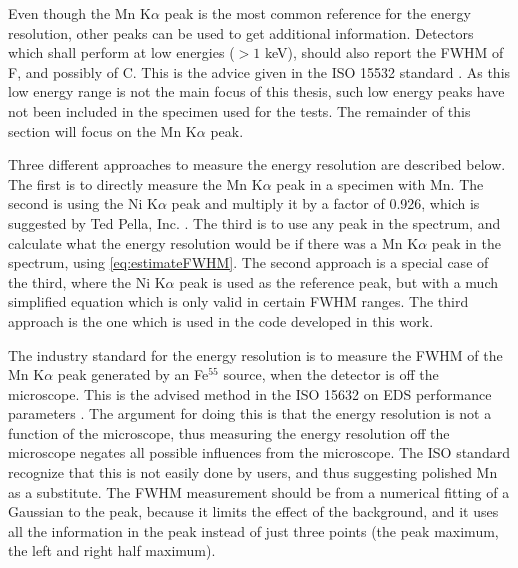 Even though the Mn K$\alpha$ peak is the most common reference for the energy resolution, other peaks can be used to get additional information.
Detectors which shall perform at low energies ($>1$ keV), should also report the FWHM of F, and possibly of C.
This is the advice given in the ISO 15532 standard \cite{iso_qc_15632}.
As this low energy range is not the main focus of this thesis, such low energy peaks have not been included in the specimen used for the tests.
The remainder of this section will focus on the Mn K$\alpha$ peak.




Three different approaches to measure the energy resolution are described below.
The first is to directly measure the Mn K$\alpha$ peak in a specimen with Mn.
The second is using the Ni K$\alpha$ peak and multiply it by a factor of 0.926, which is suggested by Ted Pella, Inc. \cite{ted_pella_nio_tem_2019}.
The third is to use any peak in the spectrum, and calculate what the energy resolution would be if there was a Mn K$\alpha$ peak in the spectrum, using \cref{eq:estimateFWHM}.
The second approach is a special case of the third, where the Ni K$\alpha$ peak is used as the reference peak, but with a much simplified equation which is only valid in certain FWHM ranges.
The third approach is the one which is used in the code developed in this work.


The industry standard for the energy resolution is to measure the FWHM of the Mn K$\alpha$ peak generated by an Fe$^{55}$ source, when the detector is off the microscope.
This is the advised method in the ISO 15632 on EDS performance parameters \cite{iso_qc_15632}.
The argument for doing this is that the energy resolution is not a function of the microscope, thus measuring the energy resolution off the microscope negates all possible influences from the microscope.
The ISO standard recognize that this is not easily done by users, and thus suggesting polished Mn as a substitute.
The FWHM measurement should be from a numerical fitting of a Gaussian to the peak, because it limits the effect of the background, and it uses all the information in the peak instead of just three points (the peak maximum, the left and right half maximum).


